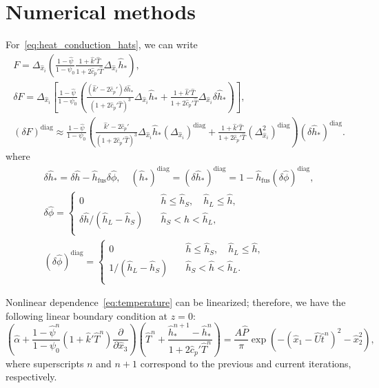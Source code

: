\documentclass{article}
\newcommand{\pder}[2][]{\frac{\partial#1}{\partial#2}}
\newcommand{\dder}[2][]{\Delta_{#2}#1}
\newcommand{\pert}[1]{\delta#1}
\newcommand{\diag}[1]{\left(#1\right)^\mathrm{diag}}
\newcommand{\fusion}[1]{{#1}_\mathrm{fus}}
\begin{document}
\section{Numerical methods}

For~\eqref{eq:heat_conduction_hats}, we can write
\begin{gather}
    F = \dder{\hat{x}_i}\left(
        \frac{1 - \hat{\psi}}{1 - \psi_0}
	    \frac{1 + \hat{k}'\hat{T}}{1 + 2\hat{c}_p'\hat{T}}
	    \dder[\hat{h}_*]{\hat{x}_i}
	\right), \\
    \pert{F} = \dder{\hat{x}_i}\left[ \frac{1 - \hat{\psi}}{1 - \psi_0} \left(
	    \frac{(\hat{k}' - 2\hat{c}_p')\pert{\hat{h}_*}}{(1 + 2\hat{c}_p'\hat{T})^3}
	     \dder[\hat{h}_*]{\hat{x}_i}
	    +
	    \frac{1 + \hat{k}'\hat{T}}{1 + 2\hat{c}_p'\hat{T}}
	    \dder[\pert{\hat{h}_*}]{\hat{x}_i}
	\right)\right], \\
    \diag{\pert{F}} \approx \frac{1 - \hat{\psi}}{1 - \psi_0} \left(
	    \frac{\hat{k}' - 2\hat{c}_p'}{(1 + 2\hat{c}_p'\hat{T})^3} \dder[\hat{h}_*]{\hat{x}_i} \diag{\dder{\hat{x}_i}}
	    +
	    \frac{1 + \hat{k}'\hat{T}}{1 + 2\hat{c}_p'\hat{T}}
	    \diag{\dder{\hat{x}_i}^2}
	\right) \diag{\pert{\hat{h}_*}}.
\end{gather}
where
\begin{gather}
    \pert{\hat{h}_*} = \pert{\hat{h}} - \fusion{\hat{h}}\pert{\hat\phi}, \quad
    \diag{\hat{h}_*} = \diag{\pert{\hat{h}_*}} = 1 - \fusion{\hat{h}}\diag{\pert{\hat\phi}}, \\
	\pert{\hat{\phi}} = \begin{cases}
        0 & \quad \hat{h} \leq \hat{h}_S, \quad \hat{h}_L \leq \hat{h}, \\
        \pert{\hat{h}}/(\hat{h}_L-\hat{h}_S) & \quad \hat{h}_S < \hat{h} < \hat{h}_L, \\
    \end{cases} \label{eq:pert_phi_h}\\
	\diag{\pert{\hat{\phi}}} = \begin{cases}
        0 & \quad \hat{h} \leq \hat{h}_S, \quad \hat{h}_L \leq \hat{h}, \\
        1/(\hat{h}_L-\hat{h}_S) & \quad \hat{h}_S < \hat{h} < \hat{h}_L. \\
    \end{cases} \label{eq:pert_phi_h_diag}
\end{gather}

Nonlinear dependence~\eqref{eq:temperature} can be linearized; therefore, we have the following linear boundary condition at \(z=0\):
\begin{equation}\label{eq:bc_linearized}
	\left( \hat{\alpha} + \frac{1 - \hat{\psi}^n}{1 - \psi_0}\left(1 + \hat{k}'\hat{T}^n\right)\pder{\hat{x}_3}\right)
	    \left( \hat{T}^n + \frac{\hat{h}_*^{n+1} - \hat{h}_*^n}{1+2\hat{c}_p'\hat{T}^n} \right)
	    = \frac{A\hat{P}}{\pi}\exp\left(-(\hat{x}_1-\hat{U}\hat{t}^n)^2 - \hat{x}_2^2\right),
\end{equation}
where superscripts \(n\) and \(n+1\) correspond to the previous and current iterations, respectively.
\end{document}
